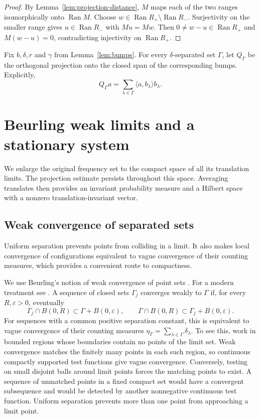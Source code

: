 \documentclass[a4paper,12pt,reqno]{amsart}
\newcommand{\lead}[1]{\par\smallskip\noindent\leavevmode#1\par\smallskip}
\theoremstyle{remark}
\numberwithin{equation}{section}
\DeclareMathOperator{\Ran}{Ran}
\begin{document}
\begin{proof}
By Lemma~\ref{lem:projection-distance}, $M$ maps each of the two ranges isomorphically onto
$\Ran M$.  Choose $w\in\Ran R_+\setminus\Ran R_-$.  Surjectivity on the
smaller range gives $u\in\Ran R_-$ with $Mu=Mw$.  Then
$0\neq w-u\in\Ran R_+$ and $M(w-u)=0$, contradicting injectivity on
$\Ran R_+$.
\end{proof}

Fix $b,\delta,r$ and $\gamma$ from Lemma~\ref{lem:bumps}. For every $\delta$-separated
set $\Gamma$, let $Q_\Gamma$ be the orthogonal projection onto the closed
span of the corresponding bumps. Explicitly,
\begin{equation}\label{eq:Q}
 Q_\Gamma a=\sum_{\lambda\in\Gamma}\langle a,b_\lambda\rangle b_\lambda.
\end{equation}

\section{Beurling weak limits and a stationary system}\label{sec:weak}

\lead{We enlarge the original frequency set to the compact space of all
its translation limits. The projection estimate persists throughout this
space. Averaging translates then provides an invariant probability measure
and a Hilbert space with a nonzero translation-invariant vector.}


\subsection{Weak convergence of separated sets}

\lead{Uniform separation prevents points from colliding in a limit. It
also makes local convergence of configurations equivalent to vague
convergence of their counting measures, which provides a convenient route
to compactness.}


We use Beurling's notion of weak convergence of point sets
\cite{Beurling}. For a modern treatment see \cite[Section~4]{GOR}.
A sequence of closed sets $\Gamma_j$ converges weakly to $\Gamma$ if,
for every $R,\varepsilon>0$, eventually
\begin{equation}\label{eq:weak-sets}
 \Gamma_j\cap B(0,R)\subset\Gamma+B(0,\varepsilon),\qquad
 \Gamma\cap B(0,R)\subset\Gamma_j+B(0,\varepsilon).
\end{equation}
For sequences with a common positive separation constant, this is equivalent
to vague convergence of their counting measures
$\eta_\Gamma=\sum_{\lambda\in\Gamma}\delta_\lambda$.
To see this, work in bounded regions whose boundaries contain no points
of the limit set. Weak convergence matches the finitely many points in
each such region, so continuous compactly supported test functions give
vague convergence. Conversely, testing on small disjoint balls around
limit points forces the matching points to exist. A sequence of unmatched
points in a fixed compact set would have a convergent subsequence and
would be detected by another nonnegative continuous test function.
Uniform separation prevents more than one point from approaching a limit
point.
\end{document}
